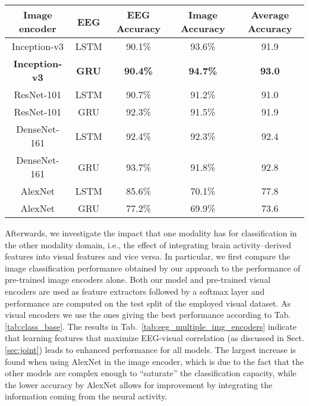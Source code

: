 \documentclass[10pt,journal,compsoc,twocolumn]{IEEEtran}
\begin{document}
\begin{table*}
	\centering
	\begin{tabular}{ccccc}
		\toprule{\textbf{Image encoder}} & \textbf{EEG} & \textbf{EEG Accuracy} & \textbf{Image Accuracy} & \textbf{Average Accuracy}\\
		\midrule
		Inception-v3  & LSTM 	& 90.1\% 	& 93.6\% & 91.9\\ %
		\textbf{Inception-v3}  & \textbf{GRU} 	& \textbf{90.4\%} 	& \textbf{94.7\%} & \textbf{93.0}\\ %
		\midrule
		ResNet-101    & LSTM 	& 90.7\% 	& 91.2\% & 91.0\\ %
		ResNet-101    & GRU 	& 92.3\% 	& 91.5\% & 91.9\\ %
		\midrule
		DenseNet-161  & LSTM 	& 92.4\% 	& 92.3\% & 92.4\\ %
		DenseNet-161  & GRU 	& 93.7\% 	& 91.8\% & 92.8\\ %
		\midrule
		AlexNet   	  & LSTM 	& 85.6\% 	& 70.1\% & 77.8\\ %
		AlexNet   	  & GRU 	& 77.2\% 	& 69.9\% & 73.6\\ %
		\bottomrule
	\end{tabular}
	\caption{EEG and image classification accuracies for different layouts of the EEG and image encoders.}
	\label{tab:class_base}
\end{table*}Afterwards, we investigate the impact that one modality has for classification in the other modality domain, i.e., the effect of integrating brain activity--derived features into visual features and vice versa. 
In particular, we first compare the image classification performance obtained by our approach to the performance of pre-trained image encoders alone. 
Both our model and pre-trained visual encoders are used as feature extractors followed by a softmax layer and performance are computed on the test split of the employed visual dataset. As visual encoders we use the ones giving the best performance according to Tab. \ref{tab:class_base}.
The results in Tab.~\ref{tab:eeg_multiple_img_encoders} indicate that learning features that maximize EEG-visual correlation (as discussed in Sect. \ref{sec:joint}) leads to enhanced performance for all models. The largest increase is found when using AlexNet in the image encoder, which is due to the fact that the other models are complex enough to ``saturate'' the classification capacity, while the lower accuracy by AlexNet allows for improvement by integrating the information coming from the neural activity.
\end{document}
